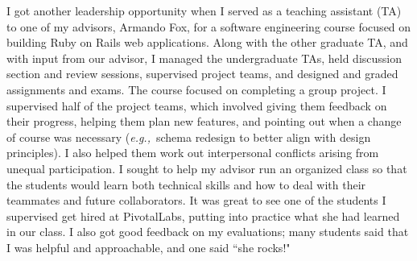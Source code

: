 \documentclass{article}
\newcommand{\eg}{{\em e.g.,}~}
\begin{document}
I got another leadership opportunity when I served as a teaching assistant (TA) to one of my advisors, Armando Fox, for a software engineering course focused on building Ruby on Rails web applications.
Along with the other graduate TA, and with input from our advisor, I managed the undergraduate TAs, held discussion section and review sessions, supervised project teams, and designed and graded assignments and exams.
The course focused on completing a group project.
I supervised half of the project teams, which involved giving them feedback on their progress, helping them plan new features, and pointing out when a change of course was necessary (\eg schema redesign to better align with design principles).
I also helped them work out interpersonal conflicts arising from unequal participation.
I sought to help my advisor run an organized class so that the students would learn both technical skills and how to deal with their teammates and future collaborators.
It was great to see one of the students I supervised get hired at PivotalLabs, putting into practice what she had learned in our class.
I also got good feedback on my evaluations; many students said that I was helpful and approachable, and one said ``she rocks!"
\end{document}
